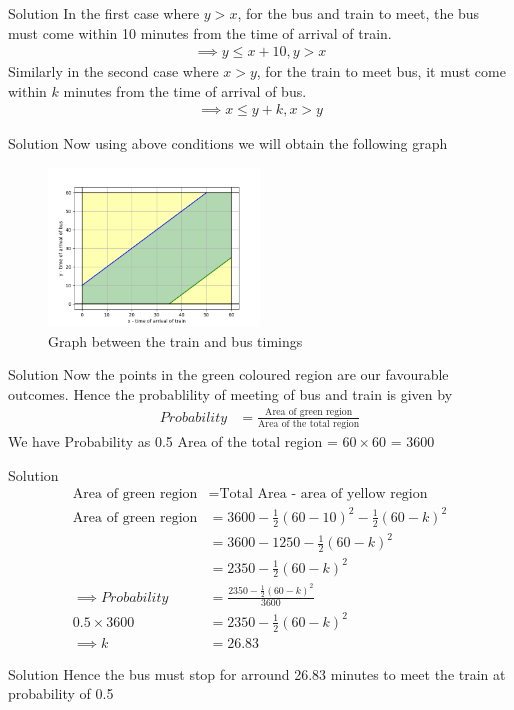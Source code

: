 \documentclass{beamer}
\theoremstyle{remark}
\numberwithin{equation}{subsection}
\begin{document}
\begin{frame}{Solution}
    In the first case where $y > x$, for the bus and train to meet, the bus must come within 10 minutes from the time of arrival of train.
    \begin{align}
        \implies y \leq x + 10,  y > x
    \end{align}
    Similarly in the second case where $x > y$, for the train to meet bus, it must come within $k$ minutes from the time of arrival of bus.
    \begin{align}
        \implies x \leq y + k , x > y
    \end{align}
    
\end{frame}

\begin{frame}{Solution}
    Now using above conditions we will obtain the following graph
    \begin{figure}
        \centering
        \includegraphics[width = 0.5\textwidth]{graph}
        \caption{Graph between the train and bus timings}
        \label{fig:my_label}
    \end{figure}
\end{frame}
\begin{frame}{Solution}
    Now the points in the green coloured region are our favourable outcomes. Hence the probablility of meeting of bus and train is given by
    \begin{align}
        Probability &= \frac{\text{Area of green region}}{\text{Area of the total region}}
    \end{align}
    We have Probability as  0.5 \newline
    Area of the total region = $60\times 60$ = 3600
\end{frame}

\begin{frame}{Solution}
    \begin{align}
        \text{Area of green region} &= \text{Total Area - area of yellow region} \\
        \text{Area of green region} &= 3600 - \frac{1}{2}(60-10)^2 -\frac{1}{2}(60-k)^2 \\
        &= 3600 - 1250 - \frac{1}{2}(60-k)^2 \\
        &= 2350 - \frac{1}{2}(60-k)^2 \\
        \implies Probability &= \frac{2350 - \frac{1}{2}(60-k)^2}{3600} \\
        0.5 \times 3600 &= 2350 - \frac{1}{2}(60-k)^2\\
        \implies k &= 26.83
    \end{align}
    
\end{frame}

\begin{frame}{Solution}
    Hence the bus must stop for arround 26.83 minutes to meet the train at probability of 0.5
\end{frame}
\end{document}
